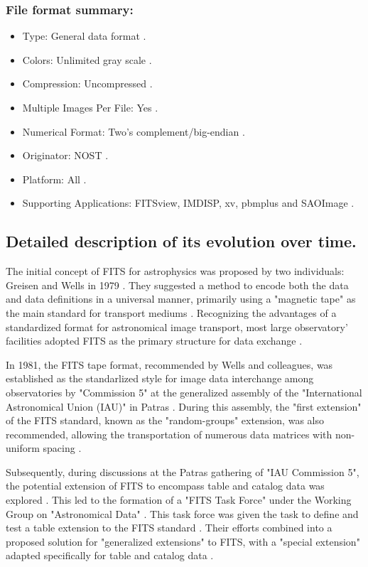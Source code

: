 \documentclass[a4paper,oneside,11pt]{book}
\begin{document}
\subsubsection{File format summary:}
\begin{itemize}
    \item Type:	General data format \citep{fits}.
    \item Colors: Unlimited gray scale \citep{fits}.
    \item Compression: Uncompressed \citep{fits}.
    \item Multiple Images Per File: Yes \citep{fits}.
    \item Numerical Format: Two's complement/big-endian \citep{fits}.
    \item Originator: NOST \citep{fits}.
    \item Platform:	All \citep{fits}.
    \item Supporting Applications: FITSview, IMDISP, xv, pbmplus and SAOImage \citep{fits}.
\end{itemize}
\subsection{Detailed description of its evolution over time.}
The initial concept of FITS for astrophysics was proposed by two individuals: Greisen and Wells  in 1979 \citep{grosbol1991fits}. They suggested a method to encode both the data and data definitions in a universal manner, primarily using a "magnetic tape" as the main standard for transport mediums \citep{grosbol1991fits}. Recognizing the advantages of a standardized format for astronomical image transport, most large observatory' facilities adopted FITS as the primary structure for data exchange \citep{grosbol1991fits}.

In 1981, the FITS tape format, recommended by Wells and colleagues, was established as the standarlized style for image data interchange among observatories by "Commission 5" at the generalized assembly of the "International Astronomical Union (IAU)" in Patras \citep{grosbol1991fits}. During this assembly, the "first extension" of the FITS standard, known as the "random-groups" extension, was also recommended, allowing the transportation of numerous data matrices with non-uniform spacing \citep{grosbol1991fits}.

Subsequently, during discussions at the Patras gathering of "IAU Commission 5", the potential extension of FITS to encompass table and catalog data was explored \citep{grosbol1991fits}. This led to the formation of a "FITS Task Force" under the Working Group on "Astronomical Data" \citep{grosbol1991fits}. This task force was given the task to define and test a table extension to the FITS standard \citep{grosbol1991fits}. Their efforts combined into a proposed solution for "generalized extensions" to FITS, with a "special extension" adapted specifically for table and catalog data \citep{grosbol1991fits}.
\end{document}
